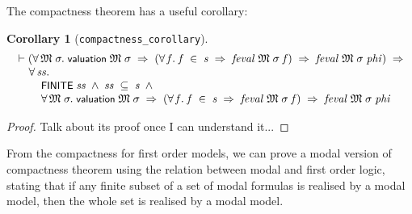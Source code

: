 \documentclass[letterpaper]{article}
\newtheorem{coro}{Corollary}
\renewcommand{\HOLConst}[1]{{\textsf{\upshape\small #1}}}
\newenvironment{holmath}{\begin{displaymath}\begin{array}{l}}{\end{array}\end{displaymath}\ignorespacesafterend}
\begin{document}
The compactness theorem has a useful corollary:
\begin{coro}[\texttt{compactness_corollary}]
\begin{holmath}
  \ensuremath{\HOLTokenTurnstile}(\HOLSymConst{\HOLTokenForall{}}\HOLBoundVar{\ensuremath{\mathfrak{M}}}\;\HOLBoundVar{\ensuremath{\sigma}}.\;\HOLConst{valuation}\;\HOLBoundVar{\ensuremath{\mathfrak{M}}}\;\HOLBoundVar{\ensuremath{\sigma}}\;\HOLSymConst{\HOLTokenImp{}}\;(\HOLSymConst{\HOLTokenForall{}}\HOLBoundVar{f}.\;\HOLBoundVar{f}\;\HOLSymConst{\HOLTokenIn{}}\;\HOLFreeVar{s}\;\HOLSymConst{\HOLTokenImp{}}\;\HOLFreeVar{feval}\;\HOLBoundVar{\ensuremath{\mathfrak{M}}}\;\HOLBoundVar{\ensuremath{\sigma}}\;\HOLBoundVar{f})\;\HOLSymConst{\HOLTokenImp{}}\;\HOLFreeVar{feval}\;\HOLBoundVar{\ensuremath{\mathfrak{M}}}\;\HOLBoundVar{\ensuremath{\sigma}}\;\HOLFreeVar{phi})\;\HOLSymConst{\HOLTokenImp{}}\\
\;\;\;\;\;\HOLSymConst{\HOLTokenForall{}}\HOLBoundVar{ss}.\\
\;\;\;\;\;\;\;\;\;\HOLConst{FINITE}\;\HOLBoundVar{ss}\;\HOLSymConst{\HOLTokenConj{}}\;\HOLBoundVar{ss}\;\HOLSymConst{\HOLTokenSubset{}}\;\HOLFreeVar{s}\;\HOLSymConst{\HOLTokenConj{}}\\
\;\;\;\;\;\;\;\;\;\HOLSymConst{\HOLTokenForall{}}\HOLBoundVar{\ensuremath{\mathfrak{M}}}\;\HOLBoundVar{\ensuremath{\sigma}}.\;\HOLConst{valuation}\;\HOLBoundVar{\ensuremath{\mathfrak{M}}}\;\HOLBoundVar{\ensuremath{\sigma}}\;\HOLSymConst{\HOLTokenImp{}}\;(\HOLSymConst{\HOLTokenForall{}}\HOLBoundVar{f}.\;\HOLBoundVar{f}\;\HOLSymConst{\HOLTokenIn{}}\;\HOLFreeVar{s}\;\HOLSymConst{\HOLTokenImp{}}\;\HOLFreeVar{feval}\;\HOLBoundVar{\ensuremath{\mathfrak{M}}}\;\HOLBoundVar{\ensuremath{\sigma}}\;\HOLBoundVar{f})\;\HOLSymConst{\HOLTokenImp{}}\;\HOLFreeVar{feval}\;\HOLBoundVar{\ensuremath{\mathfrak{M}}}\;\HOLBoundVar{\ensuremath{\sigma}}\;\HOLFreeVar{phi}
\end{holmath}
\end{coro}

\begin{proof}
Talk about its proof once I can understand it...
\end{proof}

From the compactness for first order models, we can prove a modal version of compactness theorem using the relation between modal and first order logic, stating that if any finite subset of a set of modal formulas is realised by a modal model, then the whole set is realised by a modal model.
\end{document}
